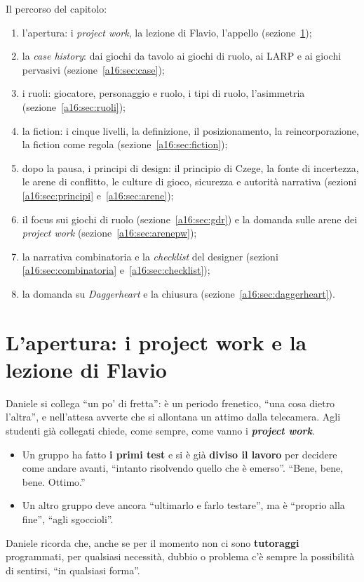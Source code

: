 Il percorso del capitolo:
\begin{enumerate}
  \item l'apertura: i \emph{project work}, la lezione di Flavio, l'appello
        (sezione~\ref{a16:sec:apertura});
  \item la \emph{case history}: dai giochi da tavolo ai giochi di ruolo, ai LARP e ai giochi
        pervasivi (sezione~\ref{a16:sec:case});
  \item i ruoli: giocatore, personaggio e ruolo, i tipi di ruolo, l'asimmetria
        (sezione~\ref{a16:sec:ruoli});
  \item la fiction: i cinque livelli, la definizione, il posizionamento, la reincorporazione,
        la fiction come regola (sezione~\ref{a16:sec:fiction});
  \item dopo la pausa, i principi di design: il principio di Czege, la fonte di incertezza, le
        arene di conflitto, le culture di gioco, sicurezza e autorità narrativa (sezioni
        \ref{a16:sec:principi} e~\ref{a16:sec:arene});
  \item il focus sui giochi di ruolo (sezione~\ref{a16:sec:gdr}) e la domanda sulle arene dei
        \emph{project work} (sezione~\ref{a16:sec:arenepw});
  \item la narrativa combinatoria e la \emph{checklist} del designer (sezioni
        \ref{a16:sec:combinatoria} e~\ref{a16:sec:checklist});
  \item la domanda su \emph{Daggerheart} e la chiusura (sezione~\ref{a16:sec:daggerheart}).
\end{enumerate}

\section{L'apertura: i project work e la lezione di Flavio}
\label{a16:sec:apertura}

Daniele si collega ``un po' di fretta'': è un periodo frenetico, ``una cosa dietro l'altra'', e
nell'attesa avverte che si allontana un attimo dalla telecamera. Agli studenti già collegati
chiede, come sempre, come vanno i \textbf{\emph{project work}}.

\begin{itemize}
  \item Un gruppo ha fatto \textbf{i primi test} e si è già \textbf{diviso il lavoro} per
        decidere come andare avanti, ``intanto risolvendo quello che è emerso''. ``Bene, bene,
        bene. Ottimo.''
  \item Un altro gruppo deve ancora ``ultimarlo e farlo testare'', ma è ``proprio alla fine'',
        ``agli sgoccioli''.
\end{itemize}
Daniele ricorda che, anche se per il momento non ci sono \textbf{tutoraggi} programmati, per
qualsiasi necessità, dubbio o problema c'è sempre la possibilità di sentirsi, ``in qualsiasi
forma''.

